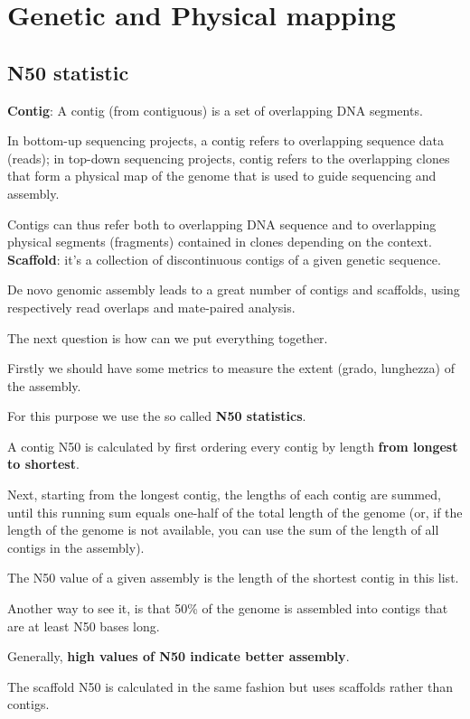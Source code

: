 \section{Genetic and Physical mapping}

\subsection{N50 statistic}

\textbf{Contig}: A contig (from contiguous) is a set of overlapping DNA
segments.

In bottom-up sequencing projects, a contig refers to overlapping sequence
data (reads); in top-down sequencing projects, contig refers to the
overlapping clones that form a physical map of the genome that is used
to guide sequencing and assembly.

Contigs can thus refer both to overlapping DNA sequence and to overlapping
physical segments (fragments) contained in clones depending on the context. \\

\textbf{Scaffold}: it's a collection of discontinuous contigs of a given
genetic sequence.

De novo genomic assembly leads to a great number of contigs and scaffolds,
using respectively read overlaps and mate-paired analysis.

The next question is how can we put everything together.


Firstly we should have some metrics to measure the extent (grado, lunghezza) of
the assembly.

For this purpose we use the so called \textbf{N50 statistics}.

A contig N50 is calculated by first ordering every contig by length
\textbf{from longest to shortest}.

Next, starting from the longest contig, the lengths of each contig are
summed, until this running sum equals one-half of the total length of the
genome (or, if the length of the genome is not available, you can use the sum
of the length of all contigs in the assembly).

The N50 value of a given assembly is the length of the shortest contig in this
list.

Another way to see it, is that 50\% of the genome is assembled into contigs
that are at least N50 bases long.

Generally, \textbf{high values of N50 indicate better assembly}.

The scaffold N50 is calculated in the same fashion but uses scaffolds rather
than contigs.


